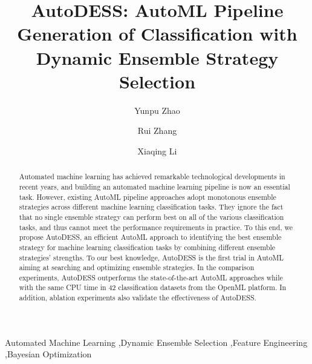 \documentclass[review]{elsarticle}
\begin{document}
\begin{frontmatter}

\title{AutoDESS: AutoML Pipeline Generation of Classification with Dynamic Ensemble Strategy Selection}


\author[mymainaddress]{Yunpu Zhao}

\author[mysecondaryaddress]{Rui Zhang}

\author[mysecondaryaddress]{Xiaqing Li}

\address[mymainaddress]{University of Science and Techonology of China}
\address[mysecondaryaddress]{SKL of Computer Architecture, Institute of Computing Technology, Chinese Academy of Sciences}

\begin{abstract}
Automated machine learning has achieved remarkable technological developments in recent years, and building an automated machine learning pipeline is now an essential task. However, existing AutoML pipeline approaches adopt monotonous ensemble strategies across different machine learning classification tasks. They ignore the fact that no single ensemble strategy can perform best on all of the various classification tasks, and thus cannot meet the performance requirements in practice. To this end, we propose AutoDESS, an efficient AutoML approach to identifying the best ensemble strategy for machine learning classification tasks by combining different ensemble strategies' strengths. To our best knowledge, AutoDESS is the first trial in AutoML aiming at searching and optimizing ensemble strategies. In the comparison experiments, AutoDESS outperforms the state-of-the-art AutoML approaches while with the same CPU time in 42 classification datasets from the OpenML platform. In addition, ablation experiments also validate the effectiveness of AutoDESS.
\end{abstract}

\begin{keyword}
Automated Machine Learning \sep Dynamic Ensemble Selection \sep Feature Engineering \sep Bayesian Optimization
\end{keyword}

\end{frontmatter}
\end{document}
